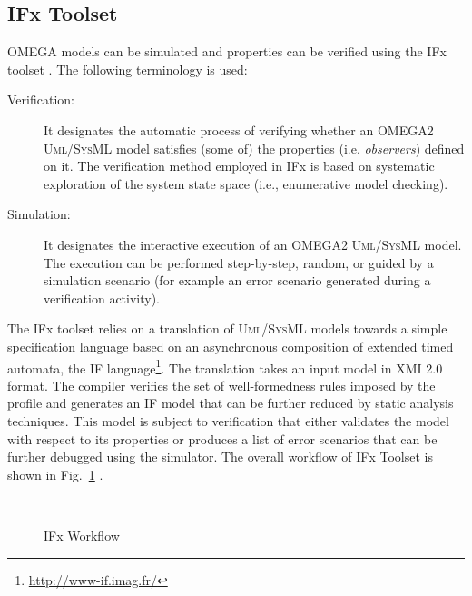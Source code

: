 \documentclass[a4paper,twoside]{article}
\def\sysml{\textsc{SysML}}
\def\uml{\textsc{Uml}}
\begin{document}
\subsection{IFx Toolset}

\noindent OMEGA models can be simulated and properties can be verified using the IFx toolset \cite{test13}. The following terminology is used: 

\begin{description}
\item[Verification:] It designates  the  automatic  process  of  verifying  whether  an  OMEGA2  \uml{}/\sysml{} model  satisfies  (some  of)  the  properties  (i.e. \textit{observers})  defined  on  it.  The  verification  method employed in IFx is based on systematic exploration of the system state space (i.e., enumerative model checking). 
\item[Simulation:] It designates  the  interactive  execution  of  an  OMEGA2  \uml{}/\sysml{}  model.  The execution  can    be  performed  step-by-step,  random,  or  guided  by  a  simulation  scenario  (for example an error scenario generated during a verification activity). 
\end{description}

The IFx toolset relies on a translation of \uml{}/\sysml{} models towards a simple specification language based on an asynchronous composition of extended timed automata, the IF language\footnote{\url{http://www-if.imag.fr/}}. The translation takes an input model in XMI 2.0 format. 
The compiler verifies the set of well-formedness rules imposed by the profile and generates an IF model that can be further reduced by static analysis techniques. This model is subject to verification that either validates the model with respect to its properties or produces a list of error scenarios that can be further debugged using the simulator. The overall workflow  of IFx Toolset is shown in Fig.~\ref{fig:flow} \cite{test14}.


\begin{figure}[!h]
  \vspace{8cm}~
  \centering
  {}
  \caption{IFx Workflow}
  \label{fig:flow}
 \end{figure}
 
\end{document}
